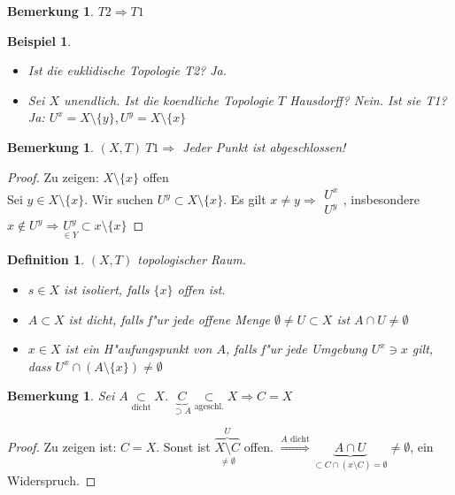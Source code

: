 \documentclass[a4paper,12pt,numbers=noenddot,parskip=full]{scrartcl}
\theoremstyle{dotless}
\newtheorem{definition}[theorem]{Definition}
\newtheorem{example}[theorem]{Beispiel}
\newtheorem{remark}[theorem]{Bemerkung}
\begin{document}
\begin{remark}
	$T2 \Rightarrow T1$
\end{remark}
\begin{example}
	\begin{itemize}
		\item Ist die euklidische Topologie T2? Ja.
		\item Sei $X$ unendlich. Ist die koendliche Topologie $T$ Hausdorff? Nein. Ist sie T1? Ja: $U^x = X \setminus \{y\}, U^y = X \setminus \{x\}$
	\end{itemize}
\end{example}
\begin{remark}
	$(X,T) ~T1 \Rightarrow$ Jeder Punkt ist abgeschlossen!
\end{remark}
\begin{proof}
	Zu zeigen: $X \setminus \{x\}$ offen\\
	Sei $y \in X \setminus \{x\}$. Wir suchen $U^y \subset X \setminus \{x\}$. Es gilt $x \neq y \Longrightarrow \begin{array}{l}
		U^x\\
		U^y
	\end{array}$, insbesondere $x \notin U^y \Longrightarrow \underset{\in Y}{U^y} \subset x \setminus \{x\}$
\end{proof}
\begin{definition}
	$(X,T)$ topologischer Raum. \begin{itemize}
		\item $s \in X$ ist \emph{isoliert}, falls $\{x\}$ offen ist.
		\item $A \subset X$ ist \emph{dicht}, falls f"ur jede offene Menge $\emptyset \neq U \subset X$ ist $A \cap U \neq \emptyset$
		\item $x \in X$ ist ein \emph{H"aufungspunkt von $A$}, falls f"ur jede Umgebung $U^x \ni x$ gilt, dass $U^x \cap (A\setminus \{x\}) \neq \emptyset$
	\end{itemize}
\end{definition}
\begin{remark}
	Sei $A \underset{\text{dicht}}{\subset} X$. $\underbrace{C}_{\supset A} \underset{\text{ageschl.}}{\subset} X \Longrightarrow C=X$
\end{remark}
\begin{proof}
	Zu zeigen ist: $C=X$. Sonst ist $\overbrace{\underset{\neq \emptyset}{X \setminus C}}^U$ offen. $\overset{A \text{ dicht}}{\Longrightarrow} \underbrace{A \cap U}_{\subset C \cap (x \setminus C) = \emptyset} \neq \emptyset$, ein Widerspruch.
\end{proof}
\end{document}
